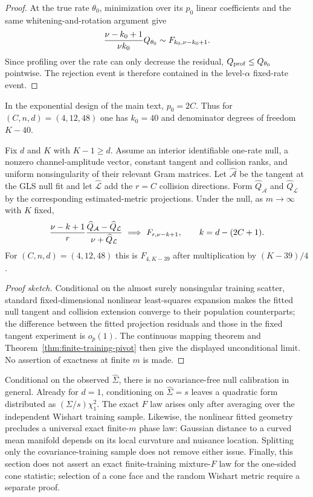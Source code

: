 \begin{proof}
At the true rate $\theta_0$, minimization over its $p_0$ linear coefficients
and the same whitening-and-rotation argument give
\[
 {\nu-k_0+1\over \nu k_0}Q_{\theta_0}
 \sim F_{k_0,\nu-k_0+1}.
\]
Since profiling over the rate can only decrease the residual,
$Q_{\rm prof}\le Q_{\theta_0}$ pointwise.  The rejection event is therefore
contained in the level-$\alpha$ fixed-rate event.
\end{proof}

In the exponential design of the main text, $p_0=2C$.  Thus for
$(C,n,d)=(4,12,48)$ one has $k_0=40$ and denominator degrees of freedom
$K-40$.

\begin{theorem}
\label{thm:finite-training-plugin}
Fix $d$ and $K$ with $K-1\ge d$.  Assume an interior identifiable one-rate
null, a nonzero channel-amplitude vector, constant tangent and collision
ranks, and uniform nonsingularity of their relevant Gram matrices.  Let
$\widehat{\mathcal A}$ be the tangent at the GLS null fit and let
$\widehat{\mathcal L}$ add the $r=C$ collision directions.  Form
$\widehat Q_{\mathcal A}$ and $\widehat Q_{\mathcal L}$ by the corresponding
estimated-metric projections.  Under the null, as $m\to\infty$ with $K$
fixed,
\[
 {\nu-k+1\over r}
 {\widehat Q_{\mathcal A}-\widehat Q_{\mathcal L}
  \over \nu+\widehat Q_{\mathcal L}}
 \ \Longrightarrow\ F_{r,\nu-k+1},
 \qquad k=d-(2C+1).
\]
For $(C,n,d)=(4,12,48)$ this is $F_{4,K-39}$ after multiplication by
$(K-39)/4$.
\end{theorem}

\begin{proof}[Proof sketch]
Conditional on the almost surely nonsingular training scatter, standard
fixed-dimensional nonlinear least-squares expansion makes the fitted null
tangent and collision extension converge to their population counterparts;
the difference between the fitted projection residuals and those in the
fixed tangent experiment is $o_p(1)$.  The continuous mapping theorem and
Theorem~\ref{thm:finite-training-pivot} then give the displayed unconditional
limit.  No assertion of exactness at finite $m$ is made.
\end{proof}

Conditional on the observed $\widehat\Sigma$, there is no covariance-free
null calibration in general.  Already for $d=1$, conditioning on
$\widehat\Sigma=s$ leaves a quadratic form distributed as
$(\Sigma/s)\chi_1^2$.  The exact $F$ law arises only after averaging over the
independent Wishart training sample.  Likewise, the nonlinear fitted geometry
precludes a universal exact finite-$m$ phase law: Gaussian distance to a
curved mean manifold depends on its local curvature and nuisance location.
Splitting only the covariance-training sample does not remove either issue.
Finally, this section does not assert an exact finite-training mixture-$F$
law for the one-sided cone statistic; selection of a cone face and the random
Wishart metric require a separate proof.
